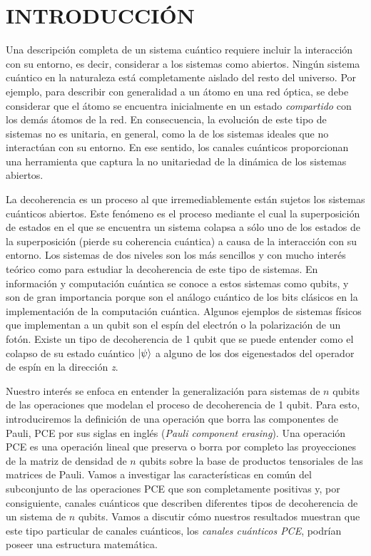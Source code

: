 \chapter{INTRODUCCIÓN}

Una descripción completa de un sistema cuántico requiere incluir la interacción
con su entorno, es decir, considerar a los sistemas como abiertos. Ningún sistema cuántico en la
naturaleza está completamente aislado del resto del universo.  
Por ejemplo, para describir con generalidad a un átomo en una red óptica, se debe
considerar que el átomo se encuentra inicialmente en un estado \textit{compartido} 
con los demás átomos de la red. En consecuencia,
la evolución de este tipo de sistemas no es unitaria, en general, como 
la de los sistemas ideales que no interactúan con su entorno. En ese sentido, 
los canales cuánticos proporcionan una herramienta que captura 
la no unitariedad de la dinámica de los sistemas abiertos.


La decoherencia es un proceso al que irremediablemente están sujetos los 
sistemas cuánticos abiertos. 
Este fenómeno es el proceso mediante 
el cual la superposición de estados en el que se encuentra un sistema colapsa a 
sólo uno de los estados de la superposición (pierde su coherencia cuántica)
a causa de la interacción con su entorno. 
Los sistemas de dos niveles son 
los más sencillos y con mucho interés teórico como para estudiar 
la decoherencia de este tipo de sistemas. En información y computación 
cuántica se conoce a estos sistemas como qubits, y son de gran importancia 
porque son el análogo cuántico de los bits clásicos en 
la implementación de la computación cuántica. 
Algunos ejemplos de sistemas físicos que implementan a un qubit son el espín
del electrón o la polarización de un fotón. 
Existe un tipo de decoherencia de 1 qubit que se puede entender como 
el colapso de su estado cuántico $\ket{\psi}$ a alguno de los dos eigenestados
del operador de espín en la dirección \textit{z}.


Nuestro interés se enfoca en entender la generalización
para sistemas de $n$ qubits de las operaciones que modelan el proceso de 
decoherencia de 1 qubit. Para esto, introduciremos la definición de una 
operación que borra las componentes de Pauli, PCE por sus siglas en inglés
(\textit{Pauli component erasing}). Una operación PCE es una operación lineal 
que preserva o borra por completo las proyecciones de la matriz de densidad de $n$ qubits
sobre la base de productos tensoriales de las matrices de Pauli. Vamos a investigar 
las características en común del subconjunto de las operaciones PCE que son 
completamente positivas y, por consiguiente, canales cuánticos que describen
diferentes tipos de decoherencia de un sistema de $n$ qubits. Vamos a 
discutir cómo nuestros resultados muestran que este tipo particular de 
canales cuánticos, los \textit{canales cuánticos PCE}, podrían poseer 
una estructura matemática. 